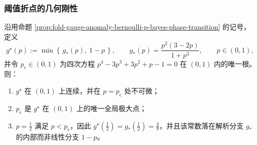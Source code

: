 \subsubsection{阈值折点的几何刚性}\label{subsubsec:fold-gauge-anomaly-bernoulli-p-kink-geometry}

\begin{proposition}\label{prop:fold-gauge-anomaly-bernoulli-p-kink-unique-max}
沿用命题 \ref{prop:fold-gauge-anomaly-bernoulli-p-bayes-phase-transition} 的记号，定义
\[
g^\star(p):=\min\!\left\{\,g_\ast(p),\ 1-p\,\right\},
\qquad
g_\ast(p)=\frac{p^2(3-2p)}{1+p^3},
\qquad p\in(0,1),
\]
并令 \(p_{\mathrm c}\in(0,1)\) 为四次方程
\(
p^4-3p^3+3p^2+p-1=0
\)
在 \((0,1)\) 内的唯一根。
则：
\begin{enumerate}
  \item \(g^\star\) 在 \((0,1)\) 上连续，并在 \(p=p_{\mathrm c}\) 处不可微；
  \item \(p_{\mathrm c}\) 是 \(g^\star\) 在 \((0,1)\) 上的唯一全局极大点；
  \item \(p=\tfrac12\) 满足 \(p< p_{\mathrm c}\)，因此 \(g^\star(\tfrac12)=g_\ast(\tfrac12)=\tfrac49\)，并且该常数落在解析分支 \(g_\ast\) 的内部而非线性分支 \(1-p\)。
\end{enumerate}
\end{proposition}
